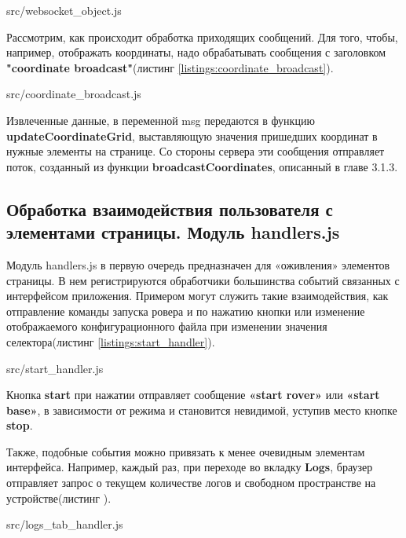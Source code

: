 
{src/websocket_object.js}

Рассмотрим, как происходит обработка приходящих сообщений. Для того, чтобы, например, отображать координаты, надо обрабатывать сообщения с заголовком \textbf{"coordinate broadcast"}(листинг \ref{listings:coordinate_broadcast}).


{src/coordinate_broadcast.js}

Извлеченные данные, в переменной msg передаются в функцию \textbf{updateCoordinateGrid}, выставляющую значения пришедших координат в нужные элементы на странице. Со стороны сервера эти сообщения отправляет поток, созданный из функции \textbf{broadcastCoordinates}, описанный в главе 3.1.3.

\subsection{Обработка взаимодействия пользователя с элементами страницы. Модуль handlers.js} \label{subsect3_2_3}

Модуль handlers.js в первую очередь предназначен для «оживления» элементов страницы. В нем регистрируются обработчики большинства событий связанных с интерфейсом приложения. Примером могут служить такие взаимодействия, как отправление команды запуска ровера и по нажатию кнопки или изменение отображаемого конфигурационного файла при изменении значения селектора(листинг \ref{listings:start_handler}).


{src/start_handler.js}

Кнопка \textbf{start} при нажатии отправляет сообщение \textbf{«start rover»} или \textbf{«start base»}, в зависимости от режима и становится невидимой, уступив место кнопке \textbf{stop}.

Также, подобные события можно привязать к менее очевидным элементам интерфейса. Например, каждый раз, при переходе во вкладку \textbf{Logs}, браузер отправляет запрос о текущем количестве логов и свободном пространстве на устройстве(листинг ).


{src/logs_tab_handler.js}

